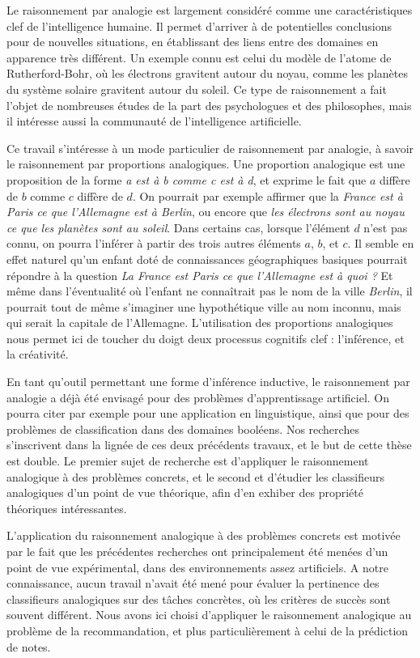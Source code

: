 Le raisonnement par analogie est largement considéré comme une caractéristiques
clef de l'intelligence humaine. Il permet d'arriver à de potentielles
conclusions pour de nouvelles situations, en établissant des liens entre des
domaines en apparence très différent. Un exemple connu  est celui du modèle de
l'atome de Rutherford-Bohr, où les électrons gravitent autour du noyau, comme
les planètes du système solaire gravitent autour du soleil. Ce type de
raisonnement a fait l'objet de nombreuses études de la part des psychologues et
des philosophes, mais il intéresse aussi la communauté de l'intelligence
artificielle.

Ce travail s'intéresse à un mode particulier de raisonnement par analogie, à
savoir le raisonnement par proportions analogiques. Une proportion analogique
est une proposition de la forme \textit{a est à b comme c est à d}, et exprime
le fait que $a$ diffère de $b$ comme $c$ diffère de $d$. On pourrait par
exemple affirmer que la \textit{France est à Paris ce que l'Allemagne est à
Berlin}, ou encore que \textit{les électrons sont au noyau ce que les planètes
sont au soleil}. Dans certains cas, lorsque l'élément $d$ n'est pas connu, on
pourra l'inférer à partir des trois autres éléments $a$, $b$, et $c$. Il semble
en effet naturel qu'un enfant doté  de connaissances géographiques basiques
pourrait répondre à la question \textit{La France est Paris ce que l'Allemagne
est à quoi ?} Et même dans l'éventualité où l'enfant ne connaîtrait pas le nom
de la ville \textit{Berlin}, il pourrait tout de même s'imaginer une
hypothétique ville au nom inconnu, mais qui serait la capitale de l'Allemagne.
L'utilisation des proportions analogiques nous permet ici de toucher du doigt
deux processus cognitifs clef : l'inférence, et la créativité.

En tant qu'outil permettant une forme d'inférence inductive, le raisonnement
par analogie a déjà été envisagé pour des problèmes d'apprentissage artificiel.
On pourra citer par exemple \cite{StrYvoCNLL05} pour une application en
linguistique, ainsi que \cite{BayMicDelIJCAI07} pour des problèmes de
classification dans des domaines booléens. Nos recherches s'inscrivent
dans la lignée de ces deux précédents travaux, et le but de cette thèse est
double. Le premier sujet de recherche est d'appliquer le raisonnement
analogique à des problèmes concrets, et le second et d'étudier les classifieurs
analogiques d'un point de vue théorique, afin d'en exhiber des propriété
théoriques intéressantes.

L'application du raisonnement analogique à des problèmes concrets est motivée
par le fait que les précédentes recherches ont principalement été menées d'un
point de vue expérimental, dans des environnements assez artificiels. A notre
connaissance, aucun travail n'avait été mené pour évaluer la pertinence des
classifieurs analogiques sur des tâches concrètes, où les critères de succès
sont souvent différent. Nous avons ici choisi d'appliquer le raisonnement
analogique au problème de la recommandation, et plus particulièrement à celui
de la prédiction de notes.

